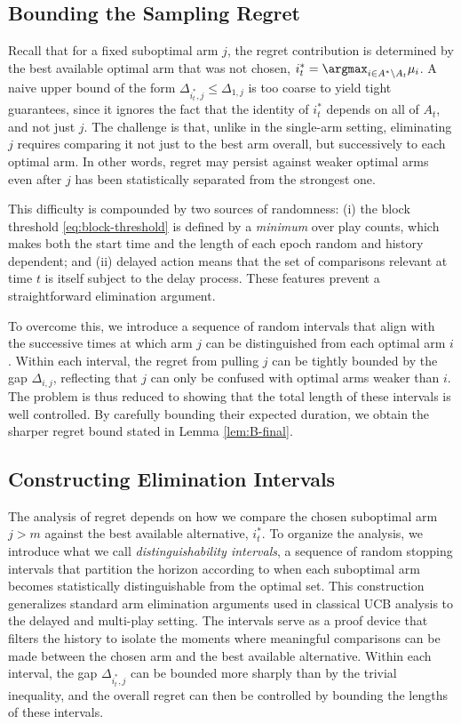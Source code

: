 \documentclass[opre,blindrev]{informs3}
\begin{document}
\begin{APPENDICES}
\section{Bounding the Sampling Regret}\label{sec:sampling_proof}
Recall that for a fixed suboptimal arm \(j\), the regret contribution is determined by the best available optimal arm that was not chosen,
$i^*_t = \argmax_{i \in A^* \setminus A_t} \mu_i$.
A naive upper bound of the form \(\Delta_{i^*_t,j} \leq \Delta_{1,j}\) is too coarse to yield tight guarantees, since it ignores the fact that the identity of \(i^*_t\) depends on all of \(A_t\), and not just \(j\). The challenge is that, unlike in the single-arm setting, eliminating \(j\) requires comparing it not just to the best arm overall, but successively to each optimal arm. In other words, regret may persist against weaker optimal arms even after \(j\) has been statistically separated from the strongest one.

This difficulty is compounded by two sources of randomness: (i) the block threshold \eqref{eq:block-threshold} is defined by a \emph{minimum} over play counts, which makes both the start time and the length of each epoch random and history dependent; and (ii) delayed action means that the set of comparisons relevant at time \(t\) is itself subject to the delay process. These features prevent a straightforward elimination argument.

To overcome this, we introduce a sequence of random intervals that align with the successive times at which arm \(j\) can be distinguished from each optimal arm \(i\). Within each interval, the regret from pulling \(j\) can be tightly bounded by the gap \(\Delta_{i,j}\), reflecting that \(j\) can only be confused with optimal arms weaker than \(i\). The problem is thus reduced to showing that the total length of these intervals is well controlled. By carefully bounding their expected duration, we obtain the sharper regret bound stated in Lemma \ref{lem:B-final}.


\subsection{Constructing Elimination Intervals}
The analysis of regret depends on how we compare the chosen suboptimal arm \(j>m\) against the best available alternative, $i_t^*$. To organize the analysis, we introduce what we call \emph{distinguishability intervals}, a sequence of random stopping intervals that partition the horizon according to when each suboptimal arm becomes statistically distinguishable from the optimal set. This construction generalizes standard arm elimination arguments used in classical UCB analysis to the delayed and multi-play setting. The intervals serve as a proof device that filters the history to isolate the moments where meaningful comparisons can be made between the chosen arm and the best available alternative. Within each interval, the gap \(\Delta_{i^*_t,j}\) can be bounded more sharply than by the trivial inequality, and the overall regret can then be controlled by bounding the lengths of these intervals.


\end{APPENDICES}
\end{document}
